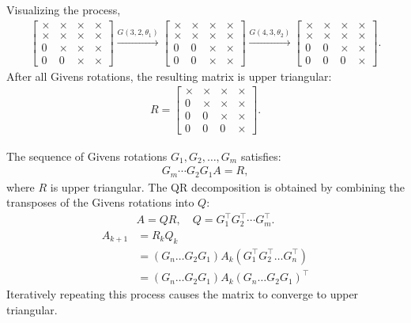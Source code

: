 \documentclass[journal, article]{IEEEtran}
\begin{document}
	Visualizing the process,
	\begin{align}
		\begin{bmatrix}
			\times & \times & \times & \times \\
			\times & \times & \times & \times \\
			0 & \times & \times & \times \\
			0 & 0 & \times & \times
		\end{bmatrix}
		\xrightarrow{G(3,2,\theta_1)}
		\begin{bmatrix}
			\times & \times & \times & \times \\
			\times & \times & \times & \times \\
			0 & 0 & \times & \times \\
			0 & 0 & \times & \times
		\end{bmatrix}
		\xrightarrow{G(4,3,\theta_2)}
		\begin{bmatrix}
			\times & \times & \times & \times \\
			\times & \times & \times & \times \\
			0 & 0 & \times & \times \\
			0 & 0 & 0 & \times
		\end{bmatrix}.
	\end{align}
	After all Givens rotations, the resulting matrix is upper triangular:
	\begin{align}
		R = \begin{bmatrix}
			\times & \times & \times & \times \\
			0 & \times & \times & \times \\
			0 & 0 & \times & \times \\
			0 & 0 & 0 & \times
		\end{bmatrix}.
	\end{align}

	The sequence of Givens rotations $G_1, G_2, \dots, G_m$ satisfies:
	\begin{align}
		G_m \cdots G_2 G_1 A = R,
	\end{align}
	where \(R\) is upper triangular. The QR decomposition is obtained by combining the transposes of the Givens rotations into \(Q\):
	\begin{align}
		A = Q R, \quad Q = G_1^{\top} G_2^{\top} \cdots G_m^{\top}.
	\end{align}
	\begin{align}
		A_{k+1}&= R_k Q_k\\
		&=(G_n \dots G_2 G_1)A_k(G_1^{\top}G_2^{\top}\dots G_n^{\top})\\
		&= (G_n \dots G_2 G_1)A_k(G_n \dots G_2 G_1)^{\top}
	\end{align}
	Iteratively repeating this process causes the matrix to converge to upper triangular.\\
\end{document}
